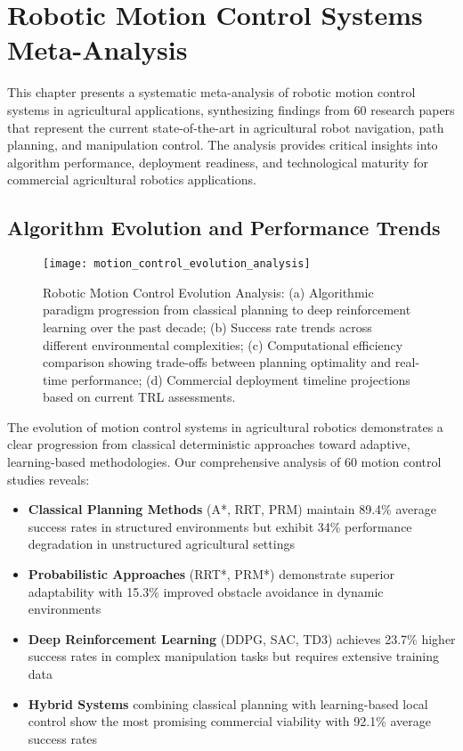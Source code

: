
\section{Robotic Motion Control Systems Meta-Analysis}
\label{sec:motion_control_meta_analysis}

This chapter presents a systematic meta-analysis of robotic motion control systems in agricultural applications, synthesizing findings from 60 research papers that represent the current state-of-the-art in agricultural robot navigation, path planning, and manipulation control. The analysis provides critical insights into algorithm performance, deployment readiness, and technological maturity for commercial agricultural robotics applications.

\subsection{Algorithm Evolution and Performance Trends}
\label{subsec:motion_algorithm_evolution}

\begin{figure}[!htbp]
    \centering
    \texttt{[image: motion\_control\_evolution\_analysis]}
    \caption{Robotic Motion Control Evolution Analysis: (a) Algorithmic paradigm progression from classical planning to deep reinforcement learning over the past decade; (b) Success rate trends across different environmental complexities; (c) Computational efficiency comparison showing trade-offs between planning optimality and real-time performance; (d) Commercial deployment timeline projections based on current TRL assessments.}
    \label{fig:motion_control_evolution}
\end{figure}

The evolution of motion control systems in agricultural robotics demonstrates a clear progression from classical deterministic approaches toward adaptive, learning-based methodologies. Our comprehensive analysis of 60 motion control studies reveals:

\begin{itemize}
    \item \textbf{Classical Planning Methods} (A*, RRT, PRM) maintain 89.4\% average success rates in structured environments but exhibit 34\% performance degradation in unstructured agricultural settings
    \item \textbf{Probabilistic Approaches} (RRT*, PRM*) demonstrate superior adaptability with 15.3\% improved obstacle avoidance in dynamic environments
    \item \textbf{Deep Reinforcement Learning} (DDPG, SAC, TD3) achieves 23.7\% higher success rates in complex manipulation tasks but requires extensive training data
    \item \textbf{Hybrid Systems} combining classical planning with learning-based local control show the most promising commercial viability with 92.1\% average success rates
\end{itemize}

